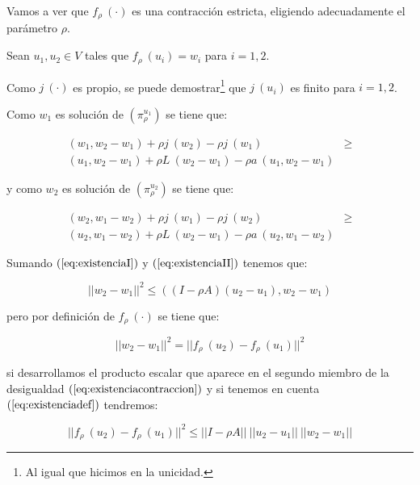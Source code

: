 \begin{demosteorema}
\begin{itemize}
Vamos a ver que $f_{\rho}\ (\cdot)$ es una contracci\'on estricta, eligiendo
adecuadamente el par\'ametro $\rho$.\newline

Sean $u_1,u_2 \in V$ tales que $f_{\rho}\ (u_i) = w_i$ para $i=1,2$.\newline

Como $j\ (\cdot)$ es propio, se puede demostrar\footnote{Al igual que hicimos
en la unicidad.} que $j\ (u_i)$ es finito para $i=1,2$.\newline

Como $w_1$ es soluci\'on de $(\pi^{u_1}_{\rho})$ se tiene que:

\begin{equation} \label{eq:existenciaI}
\begin{array}{lr}
(w_1,w_2-w_1)+\rho j\ (w_2)-\rho j\ (w_1) &\ge \\
(u_1,w_2-w_1)+\rho L\ (w_2-w_1)-\rho a\ (u_1,w_2-w_1)
\end{array}
\end{equation}

y como $w_2$ es soluci\'on de $(\pi^{u_2}_{\rho})$ se tiene que:

\begin{equation} \label{eq:existenciaII}
\begin{array}{lr}
(w_2,w_1-w_2)+\rho j\ (w_1)-\rho j\ (w_2)&\ge \\
(u_2,w_1-w_2)+\rho L\ (w_2-w_1)-\rho a\ (u_2,w_1-w_2)
\end{array}
\end{equation}

Sumando $(\ref{eq:existenciaI})$ y $(\ref{eq:existenciaII})$ tenemos que:

\begin{equation} \label{eq:existenciacontraccion}
||w_2-w_1||^2 \le ((I-\rho A)(u_2-u_1),w_2-w_1)
\end{equation}

pero por definici\'on de $f_{\rho}\ (\cdot)$ se tiene que:

\begin{equation} \label{eq:existenciadef}
||w_2-w_1||^2=||f_{\rho}\ (u_2)-f_{\rho}\ (u_1)||^2
\end{equation}

si desarrollamos el producto escalar que aparece en el segundo miembro de la
desigualdad $(\ref{eq:existenciacontraccion})$ y si tenemos en cuenta
$(\ref{eq:existenciadef})$ tendremos:

\begin{displaymath}
||f_{\rho}\ (u_2)-f_{\rho}\ (u_1)||^2 \le ||I-\rho A||\ ||u_2-u_1||\
||w_2-w_1||
\end{displaymath}


\end{itemize}
\end{demosteorema}
